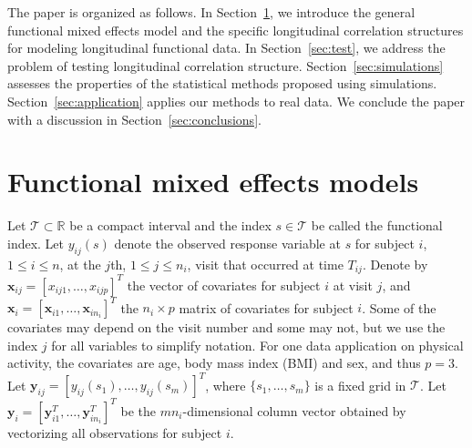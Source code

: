 \documentclass[submit]{smj}
\def\by{\mathbf{y}}
\def\bx {\mathbf{x}}
\def\by{\mathbf{y}}
\begin{document}
The paper is organized as follows. In Section~\ref{sec:sec2},  we 
introduce the general functional mixed effects model and the specific longitudinal correlation structures for modeling longitudinal functional data. In Section~\ref{sec:test}, we address the problem of testing longitudinal correlation structure. Section~\ref{sec:simulations} assesses the properties of the statistical methods proposed using simulations.  Section~\ref{sec:application} applies our methods to real data. We conclude the paper with a discussion in Section~\ref{sec:conclusions}.

\section{Functional mixed effects models} \label{sec:sec2}

Let $\mathcal{T}\subset \mathbb{R}$ be a compact interval and the index $s\in \mathcal{T}$ be called the functional index. Let $y_{ij}(s)$ denote the observed response variable at $s$ for subject $i$,  $1\leq i\leq n$, at the $j$th,  $1\leq j\leq n_i$, visit that occurred at time $T_{ij}$. Denote by $\bx_{ij}  = [x_{ij1},\ldots, x_{ijp}]^{T}$ the vector of covariates for subject $i$ at visit $j$, and $\bx_i = [\bx_{i1}, \dots, \bx_{in_i}]^{T}$ the $n_i \times p$ matrix of covariates for subject $i$. Some of the covariates may depend on the visit number and some may not, but we use the index $j$ for all variables to simplify notation. For one data application on physical activity,  the covariates are age, body mass index (BMI) and sex, and thus $p=3$. 
Let $\by_{ij} = [y_{ij}(s_1),\ldots, y_{ij}(s_m)]^{T}$, where $\{s_1,\ldots, s_m\}$ is a fixed grid in $\mathcal{T}$. Let $\by_i = [\by^{T}_{i1},\ldots, \by^{T}_{in_i}]^{T}$ be the $mn_i$-dimensional column vector obtained by vectorizing all observations for subject $i$. 
\end{document}
